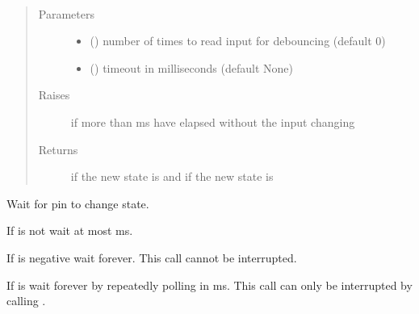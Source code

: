 \documentclass[letterpaper,10pt,english]{sphinxmanual}
\begin{document}
\begin{fulllineitems}
\begin{fulllineitems}
\end{fulllineitems}


\begin{fulllineitems}
\label{\detokenize{index:rcpy.gpio.Input.high}}~\begin{quote}\begin{description}
\item[{Parameters}] \leavevmode\begin{itemize}
\item {} 
 () \textendash{} number of times to read input for debouncing (default 0)

\item {} 
 () \textendash{} timeout in milliseconds (default None)

\end{itemize}

\item[{Raises}] \leavevmode
{\hyperref[\detokenize{index:rcpy.gpio.InputTimeout}]{}} \textendash{} if more than  ms have elapsed without the input changing

\item[{Returns}] \leavevmode
{} if the new state is {\hyperref[\detokenize{index:rcpy.gpio.HIGH}]{}} and  if the new state is {\hyperref[\detokenize{index:rcpy.gpio.LOW}]{}}

\end{description}\end{quote}

Wait for pin to change state.

If  is not  wait at most  ms.

If  is negative wait forever. This call cannot be interrupted.

If  is  wait forever by repeatedly polling in {\hyperref[\detokenize{index:rcpy.gpio.POLL_TIMEOUT}]{}} ms. This call can only be interrupted by calling {\hyperref[\detokenize{index:rcpy.exit}]{}}.


\end{fulllineitems}
\end{fulllineitems}
\end{document}

